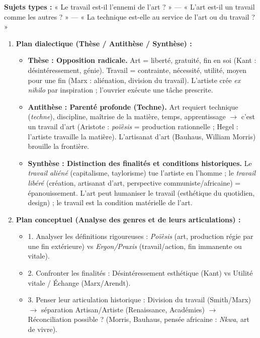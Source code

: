 \documentclass[11pt]{article}
\newcommand{\cle}[1]{{\popxbold\color{popdark}#1}}
\newcounter{popsec}
\newcounter{popsub}
\newcommand{\courssub}[1]{%
  \stepcounter{popsub}%
  \par\vspace{9pt}\noindent{\popxbold\fontsize{11.5}{13}\selectfont\color{popink}{\color{poporange}\thepopsec.\thepopsub}\hspace{6pt}#1}\par\nopagebreak\vspace{4pt}
}
\begin{document}
\courssub{Méthodes express (Bac)}

\begin{methode}
\textbf{Sujets types :} « Le travail est-il l'ennemi de l'art ? » — « L'art est-il un travail comme les autres ? » — « La technique est-elle au service de l'art ou du travail ? »
\begin{enumerate}
\item \textbf{Plan dialectique (Thèse / Antithèse / Synthèse) :}
\begin{itemize}
\item \textbf{Thèse : Opposition radicale.} Art = liberté, gratuité, fin en soi (Kant : désintéressement, génie). Travail = contrainte, nécessité, utilité, moyen pour une fin (Marx : aliénation, division du travail). L'artiste crée \emph{ex nihilo} par inspiration ; l'ouvrier exécute une tâche prescrite.
\item \textbf{Antithèse : Parenté profonde (Techne).} Art requiert \cle{technique} (\emph{techne}), discipline, maîtrise de la matière, temps, apprentissage $\rightarrow$ c'est un \cle{travail d'art} (Aristote : \emph{poïèsis} = production rationnelle ; Hegel : l'artiste travaille la matière). L'artisanat d'art (Bauhaus, William Morris) brouille la frontière.
\item \textbf{Synthèse : Distinction des finalités et conditions historiques.} Le \emph{travail aliéné} (capitalisme, taylorisme) tue l'artiste en l'homme ; le \emph{travail libéré} (création, artisanat d'art, perspective communiste/africaine) = épanouissement. L'art peut humaniser le travail (esthétique du quotidien, design) ; le travail est la condition matérielle de l'art.
\end{itemize}
\item \textbf{Plan conceptuel (Analyse des genres et de leurs articulations) :}
\begin{itemize}
\item 1. Analyser les définitions rigoureuses : \emph{Poïèsis} (art, production régie par une fin extérieure) vs \emph{Ergon/Praxis} (travail/action, fin immanente ou vitale).
\item 2. Confronter les finalités : Désintéressement esthétique (Kant) vs Utilité vitale / Échange (Marx/Arendt).
\item 3. Penser leur articulation historique : Division du travail (Smith/Marx) $\rightarrow$ séparation Artisan/Artiste (Renaissance, Académies) $\rightarrow$ Réconciliation possible ? (Morris, Bauhaus, pensée africaine : \emph{Nkwa}, art de vivre).
\end{itemize}
\end{enumerate}
\end{methode}
\end{document}
